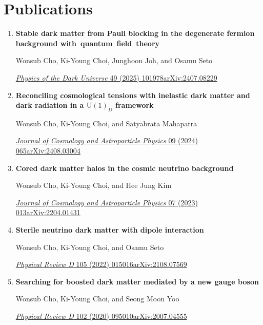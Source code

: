 \documentclass[11pt,a4paper]{article}
\newcommand{\publication}[4]{%
    \item {\raggedright\textbf{#1}\par}
    {\small #2}\par
    {\small #3\enspace\textcolor{muted}{\textperiodcentered}\enspace\href{https://arxiv.org/abs/#4}{arXiv:#4}}\par
}
\begin{document}
\noindent\begin{minipage}{\linewidth}
\section*{Publications}
\begin{enumerate}[label=\textcolor{accent}{\arabic*.},leftmargin=5mm,labelsep=2mm,itemsep=8pt,topsep=0pt,parsep=0pt]
\publication{Stable dark matter from Pauli blocking in the degenerate fermion background \mbox{with quantum field theory}}{Wonsub Cho, Ki-Young Choi, Junghoon Joh, and Osamu Seto}{\href{https://doi.org/10.1016/j.dark.2025.101978}{\textit{Physics of the Dark Universe} 49 (2025) 101978}}{2407.08229}
\publication{Reconciling cosmological tensions with inelastic dark matter and dark radiation in a $\mathrm{U}(1)_D$ framework}{Wonsub Cho, Ki-Young Choi, and Satyabrata Mahapatra}{\href{https://doi.org/10.1088/1475-7516/2024/09/065}{\textit{Journal of Cosmology and Astroparticle Physics} 09 (2024) 065}}{2408.03004}
\publication{Cored dark matter halos in the cosmic neutrino background}{Wonsub Cho, Ki-Young Choi, and Hee Jung Kim}{\href{https://doi.org/10.1088/1475-7516/2023/07/013}{\textit{Journal of Cosmology and Astroparticle Physics} 07 (2023) 013}}{2204.01431}
\publication{Sterile neutrino dark matter with dipole interaction}{Wonsub Cho, Ki-Young Choi, and Osamu Seto}{\href{https://doi.org/10.1103/PhysRevD.105.015016}{\textit{Physical Review D} 105 (2022) 015016}}{2108.07569}
\publication{Searching for boosted dark matter mediated by a new gauge boson}{Wonsub Cho, Ki-Young Choi, and Seong Moon Yoo}{\href{https://doi.org/10.1103/PhysRevD.102.095010}{\textit{Physical Review D} 102 (2020) 095010}}{2007.04555}
\end{enumerate}
\end{minipage}\par
\end{document}
